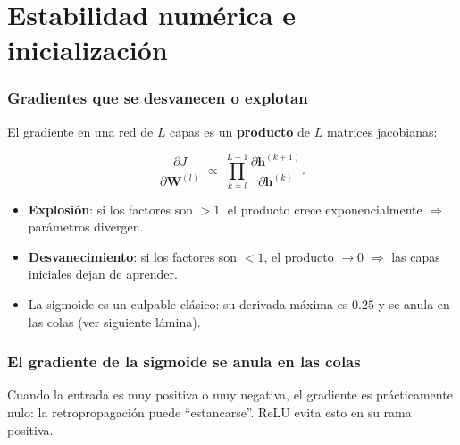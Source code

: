 \documentclass[aspectratio=169, 10pt]{beamer}
\newcommand{\h}{\bm{h}}
\newcommand{\W}{\bm{W}}
\newcommand{\formula}[1]{%
	\begin{tcolorbox}[colback=UCMBlue!8, colframe=UCMBlue, arc=4pt,
		boxsep=2pt, left=6pt, right=6pt, top=3pt, bottom=3pt]
		#1
	\end{tcolorbox}
}
\begin{document}
\section{Estabilidad num\'erica e inicializaci\'on}

\begin{frame}
\frametitle{Gradientes que se desvanecen o explotan}
El gradiente en una red de $L$ capas es un \textbf{producto} de $L$ matrices jacobianas:
\formula{\[
\frac{\partial J}{\partial \W^{(l)}} \;\propto\;
\prod_{k=l}^{L-1}\frac{\partial \h^{(k+1)}}{\partial \h^{(k)}}.
\]}
\begin{itemize}
	\item \textbf{Explosi\'on}: si los factores son $>1$, el producto crece exponencialmente $\Rightarrow$ par\'ametros divergen.
	\pause
	\item \textbf{Desvanecimiento}: si los factores son $<1$, el producto $\to 0$ $\Rightarrow$ las capas iniciales dejan de aprender.
	\pause
	\item La sigmoide es un culpable cl\'asico: su derivada m\'axima es $0.25$ y se anula en las colas (ver siguiente l\'amina).
\end{itemize}
\end{frame}

\begin{frame}
\frametitle{El gradiente de la sigmoide se anula en las colas}
\begin{center}
\end{center}
\vspace{0.2em}
\footnotesize Cuando la entrada es muy positiva o muy negativa, el gradiente es pr\'acticamente nulo: la retropropagaci\'on puede ``estancarse''. ReLU evita esto en su rama positiva.
\end{frame}
\end{document}
